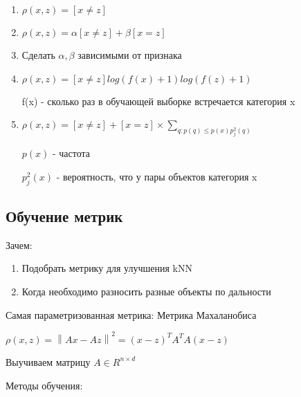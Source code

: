\documentclass[a4paper, 12pt]{article}
\newcommand\norm[1]{\left\lVert#1\right\rVert}
\begin{document}
\begin{enumerate}
    \item $\rho(x, z) = [x \neq z]$
    \item $\rho(x, z) = \alpha[x \neq z] + \beta[x = z]$
    \item Сделать $\alpha, \beta$ зависимыми от признака
    \item $\rho(x, z) = [x \neq z]log(f(x) + 1)log(f(z) + 1)$
    
    f(x) - сколько раз в обучающей выборке 
    встречается категория x

    \item $\rho(x, z) = [x \neq z] + [x = z] \times 
    \sum_{q: p(q) \leq p(x) p_{j}^2(q)}$

    $p(x)$ - частота

    $p_{j}^2(x)$ - вероятность, что у пары объектов категория x
\end{enumerate}

\subsection{Обучение метрик}

Зачем:

\begin{enumerate}
    \item Подобрать метрику для улучшения kNN
    \item Когда необходимо разносить разные объекты по дальности
\end{enumerate}

Самая параметризованная метрика: Метрика Махаланобиса

$\rho(x, z) = \norm{Ax  - Az}^2 = (x - z)^T A^TA (x - z)$

Выучиваем матрицу $A \in R^{n \times d}$

Методы обучения:
\end{document}
